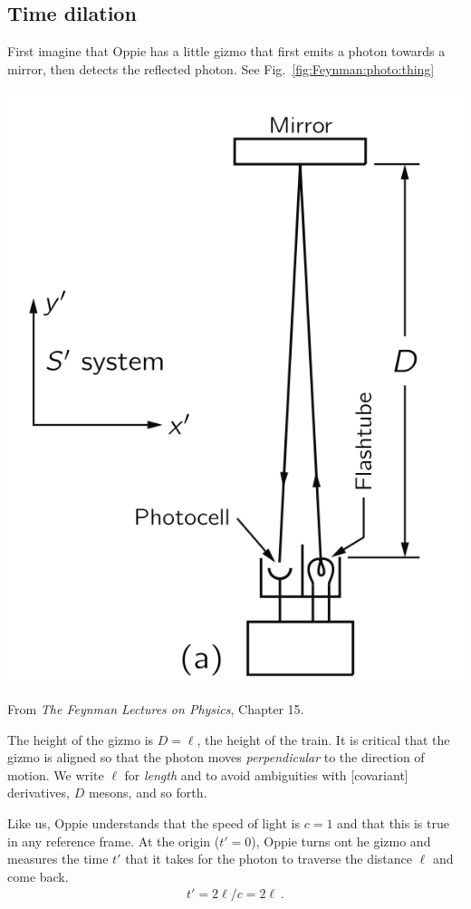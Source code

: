 \begin{subappendices}
\subsection{Time dilation}

First imagine that Oppie has a little gizmo that first emits a photon towards a mirror, then detects the reflected photon. See Fig.~\ref{fig:Feynman:photo:thing}
\begin{marginfigure}%
    \includegraphics[width=.8\textwidth]{figures/FeynmanLec15_photodet.png}
    \caption{From \emph{The Feynman Lectures on Physics}, Chapter 15.}
    \label{fig:Feynman:photo:thing}
\end{marginfigure}
The height of the gizmo is $D = \ell$, the height of the train. It is critical that the gizmo is aligned so that the photon moves \emph{perpendicular} to the direction of motion. We write $\ell$ for \emph{length} and to avoid ambiguities with [covariant] derivatives, $D$ mesons, and so forth. 

Like us, Oppie understands that the speed of light is $c=1$ and that this is true in any reference frame. At the origin ($t'=0$), Oppie turns ont he gizmo and measures the time $t'$ that it takes for the photon to traverse the distance $\ell$ and come back. 
\begin{align}
     t' = 2\ell/c = 2\ell \ .
     \label{eq:Feynman:train:updown}
\end{align}


\end{subappendices}
